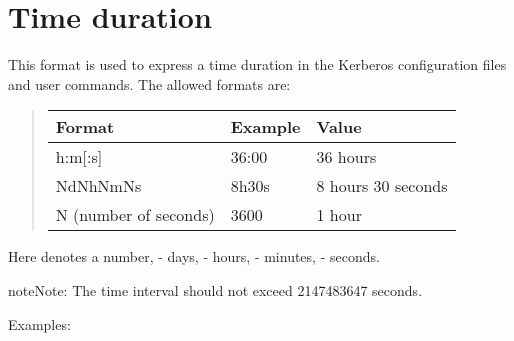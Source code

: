 \documentclass[letterpaper,10pt,english]{sphinxmanual}
\begin{document}
\section{Time duration}
\label{\detokenize{basic/date_format:duration}}\label{\detokenize{basic/date_format:time-duration}}
This format is used to express a time duration in the Kerberos
configuration files and user commands.  The allowed formats are:
\begin{quote}


\begin{savenotes}\sphinxattablestart
\centering
\begin{tabulary}{\linewidth}[t]{|T|T|T|}
\hline

Format
&
Example
&
Value
\\
\hline
h:m{[}:s{]}
&
36:00
&
36 hours
\\
\hline
NdNhNmNs
&
8h30s
&
8 hours 30 seconds
\\
\hline
N (number of seconds)
&
3600
&
1 hour
\\
\hline
\end{tabulary}
\par
\sphinxattableend\end{savenotes}
\end{quote}

Here  denotes a number,  - days,  - hours,  - minutes,
 - seconds.

\begin{sphinxadmonition}{note}{Note:}
The time interval should not exceed 2147483647 seconds.
\end{sphinxadmonition}

Examples:

%
\begin{sphinxVerbatim}[commandchars=\\\{\}]
          
   

    
    
    
    
\end{sphinxVerbatim}
\end{document}
